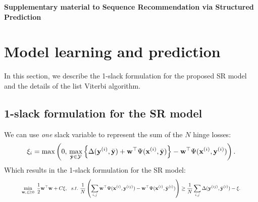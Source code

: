 \appendix
{\Large\bf Supplementary material to Sequence Recommendation via Structured Prediction}


\section{Model learning and prediction}
\label{sec:supplement}

In this section, we describe the 1-slack formulation for the proposed SR model 
and the details of the list Viterbi algorithm.

\subsection{1-slack formulation for the SR model}
\label{ssec:1slack_sr}

We can use \emph{one} slack variable to represent the sum of the $N$ hinge losses:
\begin{equation*}
\xi_i = \max \left( 0, \, 
        \max_{\bar{\mathbf{y}} \in \mathcal{Y}}
        \left\{ \Delta(\mathbf{y}^{(i)}, \bar{\mathbf{y}}) + \mathbf{w}^\top \Psi(\mathbf{x}^{(i)}, \bar{\mathbf{y}}) \right\} - \mathbf{w}^\top \Psi(\mathbf{x}^{(i)}, \mathbf{y}^{(i)}) \right).
\end{equation*}
Which results in the 1-slack formulation for the SR model:
\begin{equation*}
\resizebox{0.9\linewidth}{!}{$
\begin{aligned}
\min_{\w, \, \xi \ge 0} ~\frac{1}{2} \w^\top \w + C \xi, ~~s.t.~ \frac{1}{N} \left( \sum_{i,j} \w^\top \Psi(\x^{(i)}, \y^{(ij)}) - \w^\top \Psi(\x^{(i)}, \bar{\y}^{(i)}) \right) 
  \ge \frac{1}{N} \sum_{i,j} \Delta(\y^{(ij)}, \bar{\y}^{(i)}) - \xi.
\end{aligned}
$}
\end{equation*}



